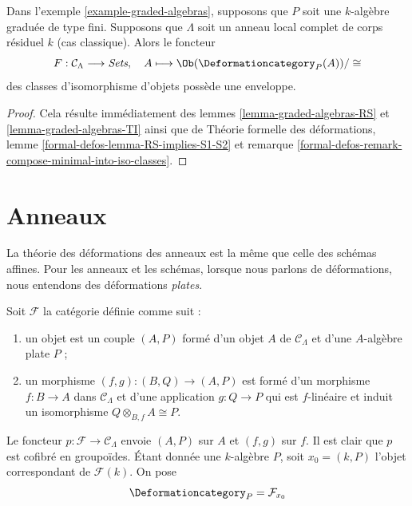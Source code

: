 \begin{lemma}
\label{lemma-graded-algebras-hull}
Dans l'exemple \ref{example-graded-algebras}, supposons que $P$ soit une
$k$-algèbre graduée de type fini. Supposons que $\Lambda$ soit un anneau local complet
de corps résiduel $k$
(cas classique). Alors le foncteur
$$
F : \mathcal{C}_\Lambda \longrightarrow \textit{Sets},\quad
A \longmapsto \Ob(\Deformationcategory_P(A))/\cong
$$
des classes d'isomorphisme d'objets possède une enveloppe.
\end{lemma}

\begin{proof}
Cela résulte immédiatement des lemmes \ref{lemma-graded-algebras-RS} et
\ref{lemma-graded-algebras-TI} ainsi que de
Théorie formelle des déformations, lemme \ref{formal-defos-lemma-RS-implies-S1-S2}
et remarque \ref{formal-defos-remark-compose-minimal-into-iso-classes}.
\end{proof}







\section{Anneaux}
\label{section-rings}

\noindent
La théorie des déformations des anneaux est la même que celle des
schémas affines. Pour les anneaux et les schémas, lorsque nous parlons de déformations,
nous entendons des déformations {\it plates}.

\begin{example}[Anneaux]
\label{example-rings}
Soit $\mathcal{F}$ la catégorie définie comme suit :
\begin{enumerate}
\item un objet est un couple $(A, P)$ formé d'un
objet $A$ de $\mathcal{C}_\Lambda$ et d'une $A$-algèbre plate $P$ ;
\item un morphisme $(f, g) : (B, Q) \to (A, P)$ est formé d'un
morphisme $f : B \to A$ dans $\mathcal{C}_\Lambda$ et
d'une application $g : Q \to P$ qui est $f$-linéaire et induit un
isomorphisme $Q \otimes_{B, f} A \cong P$.
\end{enumerate}
Le foncteur $p : \mathcal{F} \to \mathcal{C}_\Lambda$ envoie $(A, P)$
sur $A$ et $(f, g)$ sur $f$. Il est clair que $p$ est cofibré en groupoïdes.
Étant donnée une $k$-algèbre $P$, soit $x_0 = (k, P)$ l'objet correspondant
de $\mathcal{F}(k)$. On pose
$$
\Deformationcategory_P = \mathcal{F}_{x_0}
$$
\end{example}

